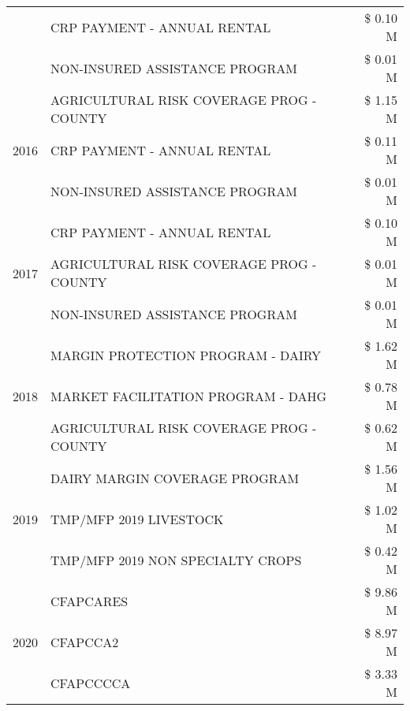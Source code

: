 \begin{tabular}{llr}
 & CRP PAYMENT - ANNUAL RENTAL & \$ 0.10 M \\
 & NON-INSURED ASSISTANCE PROGRAM & \$ 0.01 M \\
\cline{1-3}
\multirow[t]{3}{*}{2016} & AGRICULTURAL RISK COVERAGE PROG - COUNTY & \$ 1.15 M \\
 & CRP PAYMENT - ANNUAL RENTAL & \$ 0.11 M \\
 & NON-INSURED ASSISTANCE PROGRAM & \$ 0.01 M \\
\cline{1-3}
\multirow[t]{3}{*}{2017} & CRP PAYMENT - ANNUAL RENTAL & \$ 0.10 M \\
 & AGRICULTURAL RISK COVERAGE PROG - COUNTY & \$ 0.01 M \\
 & NON-INSURED ASSISTANCE PROGRAM & \$ 0.01 M \\
\cline{1-3}
\multirow[t]{3}{*}{2018} & MARGIN PROTECTION PROGRAM - DAIRY & \$ 1.62 M \\
 & MARKET FACILITATION PROGRAM - DAHG & \$ 0.78 M \\
 & AGRICULTURAL RISK COVERAGE PROG - COUNTY & \$ 0.62 M \\
\cline{1-3}
\multirow[t]{3}{*}{2019} & DAIRY MARGIN COVERAGE PROGRAM & \$ 1.56 M \\
 & TMP/MFP 2019 LIVESTOCK & \$ 1.02 M \\
 & TMP/MFP 2019 NON SPECIALTY CROPS & \$ 0.42 M \\
\cline{1-3}
\multirow[t]{3}{*}{2020} & CFAPCARES & \$ 9.86 M \\
 & CFAPCCA2 & \$ 8.97 M \\
 & CFAPCCCCA & \$ 3.33 M \\
\cline{1-3}
\bottomrule
\end{tabular}
